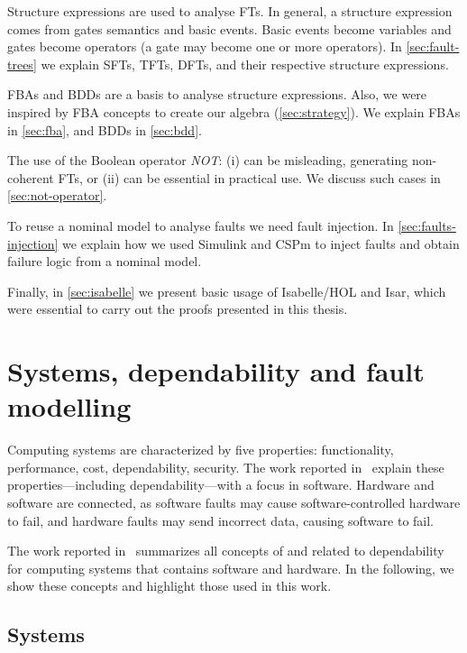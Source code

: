 \documentclass[en,twoside,onehalfspacing,phd]{risethesis}
\newcommand{\simulink}{Simulink\xspace}
\begin{document}
Structure expressions are used to analyse \aclp{FT}.
In general, a structure expression comes from gates semantics and basic events.
Basic events become variables and gates become operators (a gate may become one or more operators).
In \cref{sec:fault-trees} we explain \acp{SFT}, \acp{TFT}, \acp{DFT}, and their respective structure expressions.

\Acp{FBA} and \acp{BDD} are a basis to analyse structure expressions.
Also, we were inspired by \ac{FBA} concepts to create our \acl{algebra} (\cref{sec:strategy}).
We explain \acp{FBA} in \cref{sec:fba}, and \acp{BDD} in \cref{sec:bdd}.

The use of the Boolean operator \emph{NOT}: (i) can be misleading, generating non-coherent \aclp{FT}, or (ii) can be essential in practical use.
We discuss such cases in \cref{sec:not-operator}.

To reuse a nominal model to analyse faults we need fault injection.
In \cref{sec:faults-injection} we explain how we used \simulink and \ac{CSPm} to inject faults and obtain failure logic from a nominal model.

Finally, in \cref{sec:isabelle} we present basic usage of Isabelle/HOL and \ac{Isar}, which were essential to carry out the proofs presented in this thesis.

\section{Systems, dependability and fault modelling}
\label{sec:dependability}

Computing systems are characterized by five properties: functionality, performance, cost, dependability, security.
The work reported in~\cite[p. 289--302]{Sommerville2011} explain these properties---including dependability---with a focus in software.
Hardware and software are connected, as software faults may cause software-controlled hardware to fail, and hardware faults may send incorrect data, causing software to fail.

The work reported in~\cite{ALR+2004} summarizes all concepts of and related to dependability for computing systems that contains software and hardware.
In the following, we show these concepts and highlight those used in this work.

\subsection{Systems}
\end{document}
